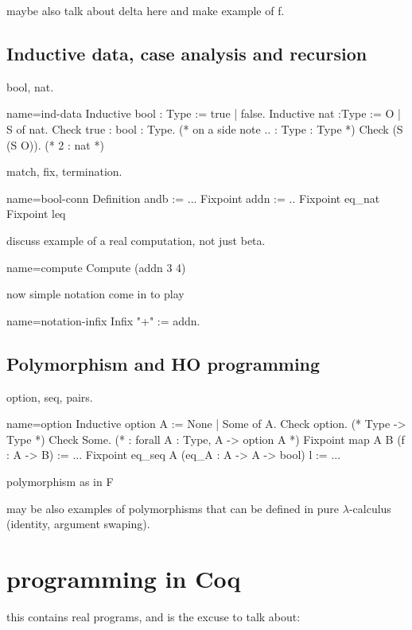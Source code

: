 maybe also talk about delta here and make example of f.

\subsection{Inductive data, case analysis and recursion}
bool, nat.

\begin{coq}{name=ind-data}{}
Inductive bool : Type := true | false.
Inductive nat :Type := O | S of nat.
Check true : bool : Type. (* on a side note .. : Type : Type *)
Check (S (S O)). (* 2 : nat *)
\end{coq}




match, fix, termination.

\begin{coq}{name=bool-conn}{}
Definition andb := ...
Fixpoint addn := ..
Fixpoint eq_nat
Fixpoint leq
\end{coq}

discuss example of a real computation, not just beta.

\begin{coq}{name=compute}{}
Compute (addn 3 4)
\end{coq}

now simple notation come in to play

\begin{coq}{name=notation-infix}{}
Infix "+" := addn.
\end{coq}

\subsection{Polymorphism and HO programming}
option, seq, pairs.

\begin{coq}{name=option}{}
Inductive option A := None | Some of A.
Check option. (* Type -> Type *)
Check Some. (* : forall A : Type, A -> option A *)
Fixpoint map A B (f : A -> B) := ...
Fixpoint eq_seq A (eq_A : A -> A -> bool) l := ...
\end{coq}

polymorphism as in F

may be also examples of polymorphisms that can be defined in pure
$\lambda$-calculus (identity, argument swaping).

\section{programming in Coq}
this contains real programs, and is the excuse to talk about:

